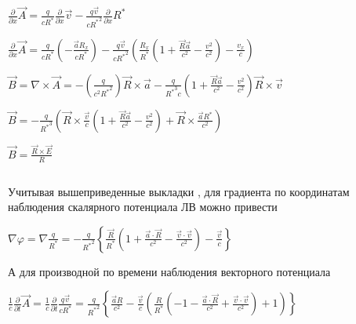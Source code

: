 \documentclass[11pt]{article}
\makeatletter
\newcommand{\boxspacing}{\kern\kvtcb@left@rule\kern\kvtcb@boxsep}
\newcommand{\prompt}[4]{
        {\ttfamily\llap{{\color{#2}[#3]:\hspace{3pt}#4}}\vspace{-\baselineskip}}
    }
\makeatother
\begin{document}
\(\frac{\partial}{\partial x}\vec{A} = \frac{q}{c{R}^{*}}\frac{\partial}{\partial x} \vec{v} - \frac{q\vec{v}}{c{{R}^{*}}^2}\frac{\partial}{\partial x} {{R}^{*}}\)

\(\frac{\partial}{\partial x}\vec{A} = \frac{q}{c{{R}^{*}} }\left(-\frac{\vec{a}R_x}{c{{R}^{*}}}\right)- \frac{q\vec{v}}{c{{R}^{*}}^2}\left(\frac{R_x}{{{R}^{*}}}\left(1 +\frac{\vec{R}\vec{a}}{c^2} - \frac{v^2}{c^2}\right) - \frac{v_x}{c}\right)\)

\(\vec{B} = \nabla\times\vec{A} = -\left(\frac{q}{c^2 {{R}^{*}}^2}\right)\vec{R}\times\vec{a} - \frac{q}{{{R}^{*}}^3 c}\left(1 + \frac{\vec{R}\vec{a}}{c^2} - \frac{v^2}{c^2}\right)\vec{R}\times\vec{v}\)

\(\vec{B} = -\frac{q}{{{R}^{*}}^3}\left(\vec{R}\times\frac{\vec{v}}{c}\left(1 + \frac{\vec{R}\vec{a}}{c^2} - \frac{v^2}{c^2}\right) + \vec{R}\times\frac{\vec{a}{{R}^{*}}}{c^2}\right)\)

\(\vec{B} = \frac{\vec{R}\times\vec{E}}{R}\)

    \begin{tcolorbox}[breakable, size=fbox, boxrule=1pt, pad at break*=1mm,colback=cellbackground, colframe=cellborder]
\prompt{In}{incolor}{ }{\boxspacing}
\begin{Verbatim}[commandchars=\\\{\}]

\end{Verbatim}
\end{tcolorbox}

    Учитывая вышеприведенные выкладки \cite{rustot}, для градиента по
координатам наблюдения скалярного потенциала ЛВ можно привести

\(\nabla \varphi =\nabla \frac{q}{{{R}^{*}}}=-\frac{q}{{{R}^{*}}^{2}}\left\{ \frac{\overrightarrow{R}}{{{R}^{*}}}\left( 1+\frac{\overrightarrow{a}\cdot \overrightarrow{R}}{{{c}^{2}}}-\frac{\overrightarrow{v}\cdot \overrightarrow{v}}{{{c}^{2}}} \right)-\frac{\overrightarrow{v}}{c} \right\}\)

А для производной по времени наблюдения векторного потенциала

\(\frac{1}{c}\frac{\partial }{\partial t}\overrightarrow{A}=\frac{1}{c}\frac{\partial }{\partial t}\frac{q\overrightarrow{v}}{c{{R}^{*}}}=\frac{q}{{{R}^{*}}^{2}}\left\{ \frac{\overrightarrow{a}R}{{{c}^{2}}}-\frac{\overrightarrow{v}}{c}\left( \frac{R}{{{R}^{*}}}\left( -1-\frac{\overrightarrow{a}\cdot \overrightarrow{R}}{{{c}^{2}}}+\frac{\overrightarrow{v}\cdot \overrightarrow{v}}{{{c}^{2}}} \right)+1 \right) \right\}\)
\end{document}
